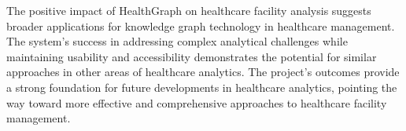 \documentclass[12pt,a4paper]{report}
\begin{document}
The positive impact of HealthGraph on healthcare facility analysis suggests broader applications for knowledge graph technology in healthcare management. The system's success in addressing complex analytical challenges while maintaining usability and accessibility demonstrates the potential for similar approaches in other areas of healthcare analytics. The project's outcomes provide a strong foundation for future developments in healthcare analytics, pointing the way toward more effective and comprehensive approaches to healthcare facility management.



\end{document}
